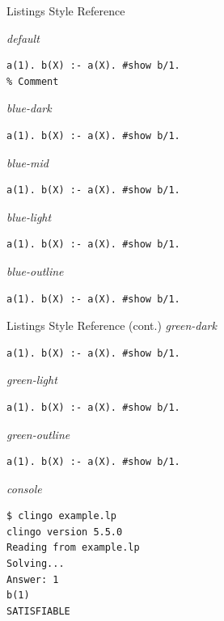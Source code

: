 \begin{frame}[fragile]{Listings Style Reference}

\tiny
\textit{default}
\begin{lstlisting}[language=clingos]
a(1). b(X) :- a(X). #show b/1.
% Comment
\end{lstlisting}


\textit{blue-dark}
\begin{lstlisting}[style=blue-dark]
a(1). b(X) :- a(X). #show b/1.
\end{lstlisting}
\textit{blue-mid}
\begin{lstlisting}[style=blue-mid]
a(1). b(X) :- a(X). #show b/1.
\end{lstlisting}
\textit{blue-light}
\begin{lstlisting}[style=blue-light]
a(1). b(X) :- a(X). #show b/1.
\end{lstlisting}
\textit{blue-outline}
\begin{lstlisting}[style=blue-outline]
a(1). b(X) :- a(X). #show b/1.
\end{lstlisting}

\end{frame}
\begin{frame}[fragile]{Listings Style Reference (cont.)}
\textit{green-dark}
\begin{lstlisting}[style=green-dark]
a(1). b(X) :- a(X). #show b/1.
\end{lstlisting}
\textit{green-light}
\begin{lstlisting}[style=green-light]
a(1). b(X) :- a(X). #show b/1.
\end{lstlisting}
\textit{green-outline}
\begin{lstlisting}[style=green-outline]
a(1). b(X) :- a(X). #show b/1.
\end{lstlisting}
\textit{console}
\begin{lstlisting}[style=console]
$ clingo example.lp
clingo version 5.5.0
Reading from example.lp
Solving...
Answer: 1
b(1)
SATISFIABLE
\end{lstlisting}


\end{frame}

